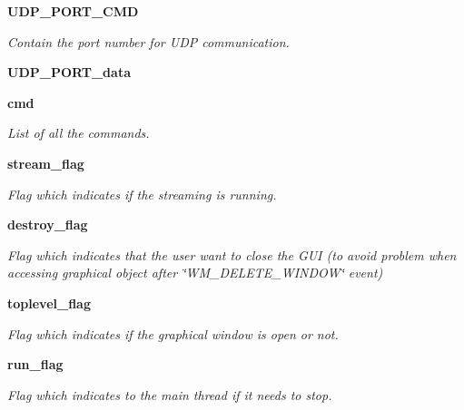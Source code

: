 \begin{DoxyCompactItemize}
\mbox{\label{classwatchman_1_1_watchman__main__window_a41a6510deb1b971886b41b0229a49691}} 
\textbf{ U\+D\+P\+\_\+\+P\+O\+R\+T\+\_\+\+C\+MD}
\begin{DoxyCompactList}\small\item\em Contain the port number for U\+DP communication. \end{DoxyCompactList}\item 
\mbox{\label{classwatchman_1_1_watchman__main__window_a14cf83a45dee5b496b1b2f1455183993}} 
{\bfseries U\+D\+P\+\_\+\+P\+O\+R\+T\+\_\+data}
\item 
\mbox{\label{classwatchman_1_1_watchman__main__window_a310b7c8167f86e485d54689b8aa1ed12}} 
\textbf{ cmd}
\begin{DoxyCompactList}\small\item\em List of all the commands. \end{DoxyCompactList}\item 
\mbox{\label{classwatchman_1_1_watchman__main__window_a608d68c02b11a3ba990599f3f74966db}} 
\textbf{ stream\+\_\+flag}
\begin{DoxyCompactList}\small\item\em Flag which indicates if the streaming is running. \end{DoxyCompactList}\item 
\mbox{\label{classwatchman_1_1_watchman__main__window_af052cb05a64993a264845c315adec90f}} 
\textbf{ destroy\+\_\+flag}
\begin{DoxyCompactList}\small\item\em Flag which indicates that the user want to close the G\+UI (to avoid problem when accessing graphical object after \char`\"{}\+W\+M\+\_\+\+D\+E\+L\+E\+T\+E\+\_\+\+W\+I\+N\+D\+O\+W\char`\"{} event) \end{DoxyCompactList}\item 
\mbox{\label{classwatchman_1_1_watchman__main__window_ae90b59be8f712831ff2a5a9002254736}} 
\textbf{ toplevel\+\_\+flag}
\begin{DoxyCompactList}\small\item\em Flag which indicates if the graphical window is open or not. \end{DoxyCompactList}\item 
\mbox{\label{classwatchman_1_1_watchman__main__window_a368aa3e2ce00b599672a3d07c79ff2b7}} 
\textbf{ run\+\_\+flag}
\begin{DoxyCompactList}\small\item\em Flag which indicates to the main thread if it needs to stop. \end{DoxyCompactList}\item 

\end{DoxyCompactItemize}
